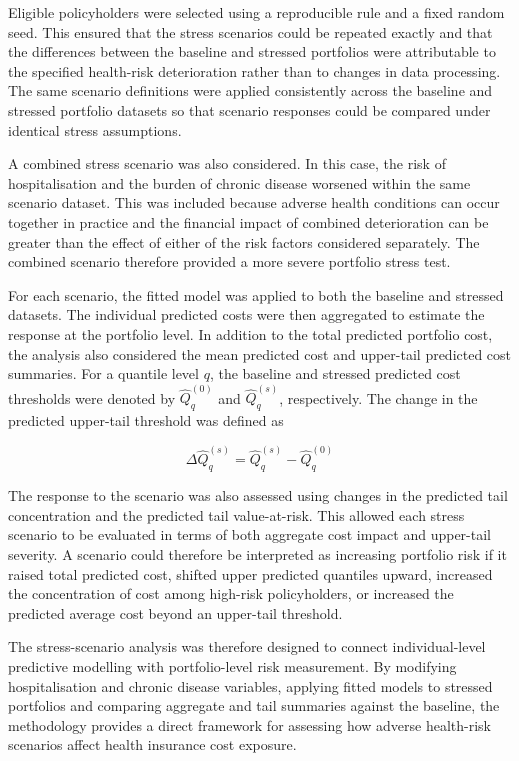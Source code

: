 	Eligible policyholders were selected using a reproducible rule and a fixed random seed. This ensured that the stress scenarios could be repeated exactly and that the differences between the baseline and stressed portfolios were attributable to the specified health-risk deterioration rather than to changes in data processing. The same scenario definitions were applied consistently across the baseline and stressed portfolio datasets so that scenario responses could be compared under identical stress assumptions.
	
	A combined stress scenario was also considered. In this case, the risk of hospitalisation and the burden of chronic disease worsened within the same scenario dataset. This was included because adverse health conditions can occur together in practice and the financial impact of combined deterioration can be greater than the effect of either of the risk factors considered separately. The combined scenario therefore provided a more severe portfolio stress test.
	
	For each scenario, the fitted model was applied to both the baseline and stressed datasets. The individual predicted costs were then aggregated to estimate the response at the portfolio level. In addition to the total predicted portfolio cost, the analysis also considered the mean predicted cost and upper-tail predicted cost summaries. For a quantile level \(q\), the baseline and stressed predicted cost thresholds were denoted by \(\hat{Q}_q^{(0)}\) and \(\hat{Q}_q^{(s)}\), respectively. The change in the predicted upper-tail threshold was defined as
	
	\begin{equation}
		\Delta \hat{Q}_q^{(s)}
		=
		\hat{Q}_q^{(s)} - \hat{Q}_q^{(0)}
	\end{equation}
	
	The response to the scenario was also assessed using changes in the predicted tail concentration and the predicted tail value-at-risk. This allowed each stress scenario to be evaluated in terms of both aggregate cost impact and upper-tail severity. A scenario could therefore be interpreted as increasing portfolio risk if it raised total predicted cost, shifted upper predicted quantiles upward, increased the concentration of cost among high-risk policyholders, or increased the predicted average cost beyond an upper-tail threshold.
	
	The stress-scenario analysis was therefore designed to connect individual-level predictive modelling with portfolio-level risk measurement. By modifying hospitalisation and chronic disease variables, applying fitted models to stressed portfolios and comparing aggregate and tail summaries against the baseline, the methodology provides a direct framework for assessing how adverse health-risk scenarios affect health insurance cost exposure.
	
